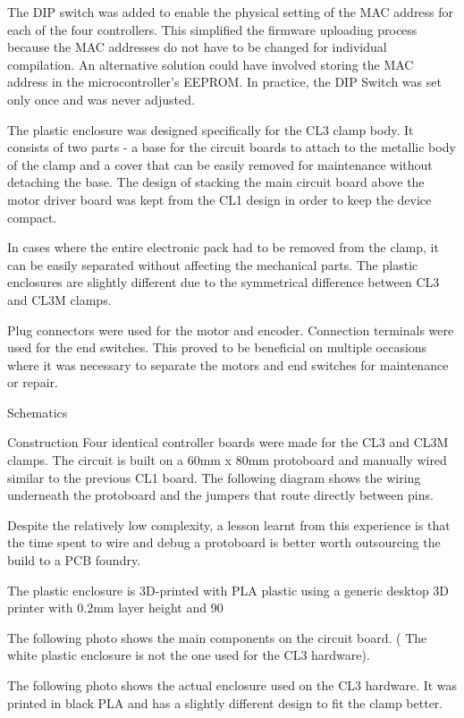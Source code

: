 The DIP switch was added to enable the physical setting of the MAC address for each of the four controllers. This simplified the firmware uploading process because the MAC addresses do not have to be changed for individual compilation. An alternative solution could have involved storing the MAC address in the microcontroller's EEPROM. In practice, the DIP Switch was set only once and was never adjusted. 

The plastic enclosure was designed specifically for the CL3 clamp body. It consists of two parts - a base for the circuit boards to attach to the metallic body of the clamp and a cover that can be easily removed for maintenance without detaching the base. The design of stacking the main circuit board above the motor driver board was kept from the CL1 design in order to keep the device compact. 

In cases where the entire electronic pack had to be removed from the clamp, it can be easily separated without affecting the mechanical parts. The plastic enclosures are slightly different due to the symmetrical difference between CL3 and CL3M clamps. 

Plug connectors were used for the motor and encoder. Connection terminals were used for the end switches. This proved to be beneficial on multiple occasions where it was necessary to separate the motors and end switches for maintenance or repair.

Schematics

Construction
Four identical controller boards were made for the CL3 and CL3M clamps. The circuit is built on a 60mm x 80mm protoboard and manually wired similar to the previous CL1 board. The following diagram shows the wiring underneath the protoboard and the jumpers that route directly between pins.

Despite the relatively low complexity, a lesson learnt from this experience is that the time spent to wire and debug a protoboard is better worth outsourcing the build to a PCB foundry. 

The plastic enclosure is 3D-printed with PLA plastic using a generic desktop 3D printer with 0.2mm layer height and 90%

The following photo shows the main components on the circuit board. ( The white plastic enclosure is not the one used for the CL3 hardware). 

The following photo shows the actual enclosure used on the CL3 hardware. It was printed in black PLA and has a slightly different design to fit the clamp better.

